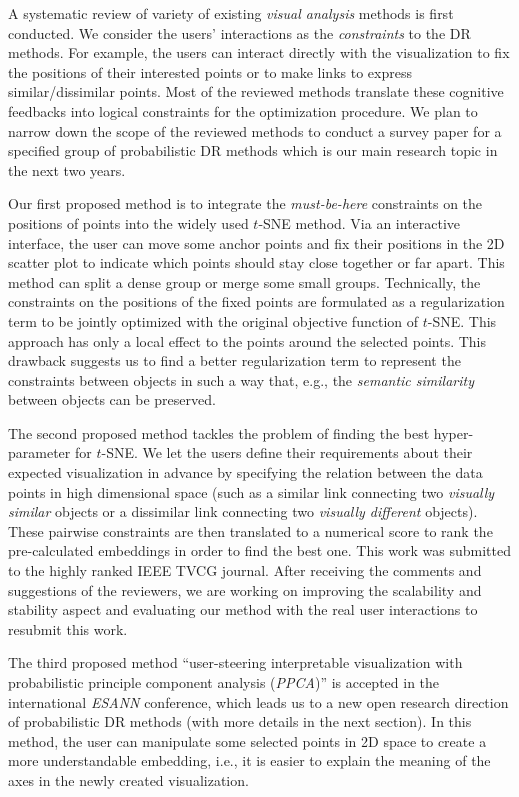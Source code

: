 \documentclass[11pt, a4paper]{article}
\begin{document}
A systematic review of variety of existing \emph{visual analysis} methods is first conducted.
We consider the users' interactions as the \emph{constraints} to the DR methods.
For example, the users can interact directly with the visualization to fix the positions of their interested points or to make links to express similar/dissimilar points.
Most of the reviewed methods translate these cognitive feedbacks into logical constraints for the optimization procedure.
We plan to narrow down the scope of the reviewed methods to conduct a survey paper for a specified group of probabilistic DR methods which is our main research topic in the next two years.

Our first proposed method is to integrate the \emph{must-be-here} constraints on the positions of points into the widely used $t$-SNE method.
Via an interactive interface, the user can move some anchor points and fix their positions in the 2D scatter plot to indicate which points should stay close together or far apart.
This method can split a dense group or merge some small groups.
Technically, the constraints on the positions of the fixed points are formulated as a regularization term to be jointly optimized with the original objective function of $t$-SNE.
This approach has only a local effect to the points around the selected points.
This drawback suggests us to find a better regularization term to represent the constraints between objects in such a way that, e.g., the \emph{semantic similarity} between objects can be preserved.

The second proposed method tackles the problem of finding the best hyper-parameter for $t$-SNE.
We let the users define their requirements about their expected visualization in advance by specifying the relation between the data points in high dimensional space (such as a similar link connecting two \emph{visually similar} objects or a dissimilar link connecting two \emph{visually different} objects).
These pairwise constraints are then translated to a numerical score to rank the pre-calculated embeddings in order to find the best one.
This work was submitted to the highly ranked IEEE TVCG journal.
After receiving the comments and suggestions of the reviewers, we are working on improving the scalability and stability aspect and evaluating our method with the real user interactions to resubmit this work.

The third proposed method ``user-steering interpretable visualization with probabilistic principle component analysis (\emph{PPCA})'' is accepted in the international \emph{ESANN} conference, which leads us to a new open research direction of probabilistic DR methods (with more details in the next section).
In this method, the user can manipulate some selected points in 2D space to create a more understandable embedding, i.e., it is easier to explain the meaning of the axes in the newly created visualization.
\end{document}
